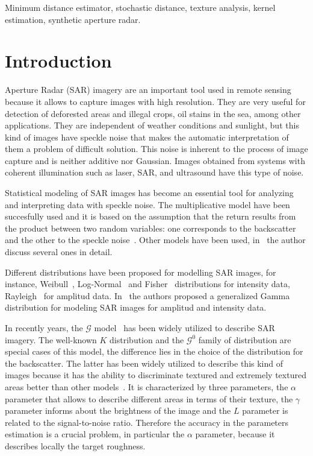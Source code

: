 \documentclass[journal]{IEEEtran}
\numberwithin{equation}{section}
\begin{document}
\begin{keywords}
Minimum distance estimator, stochastic distance, texture analysis, kernel estimation, synthetic aperture radar.
\end{keywords}

\IEEEpeerreviewmaketitle

\section{Introduction}
\label{intro}
 Aperture Radar (SAR) imagery are an important tool used in
remote sensing because it allows to capture images with high resolution. They are very useful for detection of deforested areas and illegal crops, oil stains in the sea, among other applications. They are independent of weather conditions and sunlight, but this kind of images have speckle noise that makes the automatic interpretation of them a problem of difficult solution. This noise is inherent to the process of image capture and is neither additive nor Gaussian. Images obtained from systems with coherent illumination such as laser, SAR, and ultrasound have this type of noise.

Statistical modeling of SAR images has become an essential tool for analyzing and interpreting data with speckle noise. The multiplicative model have been succesfully used and it is based on the assumption that the return results from the product between two random variables: one corresponds to the backscatter and the other to the speckle noise~\cite{oliverquegan98}. Other models have been used, in~\cite{Gao2010} the author discuss several ones in detail.

Different distributions have been proposed for modelling SAR images, for instance, Weibull~\cite{Oliver1993}, Log-Normal~\cite{oliverquegan98} and Fisher~\cite{Tupin2004} distributions for intensity data, Rayleigh~\cite{oliverquegan98} for amplitud data. In~\cite{Li2011} the authors proposed a generalized Gamma distribution for modeling SAR images for amplitud and intensity data.

In recently years, the $\mathcal G$ model~\cite{Frery97} has been widely utilized to describe SAR imagery. 
The well-known $K$ distribution and the $\mathcal G^0$ family of distribution are special cases of this model, the difference lies in the choice of the distribution for the backscatter.  
The latter has been widely utilized to describe this kind of images because it has the ability to discriminate textured and extremely textured areas better than other models~\cite{MejailJacoboFreryBustos:IJRS}. 
It is characterized by three parameters, the $\alpha$ parameter that allows to describe different areas in terms of their texture, the $\gamma$ parameter informs about the brightness of the image and the $L$ parameter is related to the signal-to-noise ratio. 
Therefore the accuracy in the parameters estimation is a crucial problem, in particular the $\alpha$ parameter, because it describes locally the target roughness.
\end{document}
